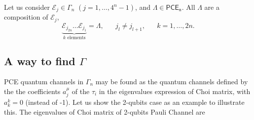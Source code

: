 \documentclass[11pt,dvipsnames]{article} %
\newcommand{\E}{\mathcal{E}}
\newcommand{\1}{\mathds{1}}
\newcommand{\PCE}[1]{\mathsf{PCE}_\mathsf{#1}}
\begin{document}
Let us consider $\E_j\in\Gamma_n$ $(j=1,\ldots,4^{n}-1)$,
and $\Lambda\in\PCE{n}$. All $\Lambda$ are a composition of 
$\E_j$,
\begin{equation}\label{eq:PCE-characterization}
\underbrace{\E_{j_{2n}}\ldots\E_{j_1}}_{k\text{ elements}}=\Lambda,
\hspace{20pt}
j_l\neq j_{l+1},
\hspace{20pt}
k=1,\ldots,2n.
\end{equation}
\subsection*{A way to find $\Gamma$} %
PCE quantum channels in $\Gamma_n$ may be found as the quantum 
channels defined by the the coefficients $a_j^{\mu}$ of the $\tau_i$
in the eigenvalues expression of Choi matrix, with $a^{k}_{k}=0$ 
(instead of -1). Let us show the 2-qubits case as an example to illustrate this. 
The eigenvalues of Choi matrix of 2-qubits Pauli Channel are
\end{document}
